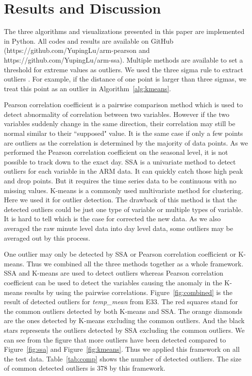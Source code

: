 \section{Results and Discussion}
The three algorithms and visualizations presented in this paper are 
implemented in Python. All codes and results are available on GitHub 
(https://github.com/YupingLu/arm-pearson and https://github.com/YupingLu/arm-ssa). 
Multiple methods are available to set a threshold for extreme values as 
outliers. We used the three sigma rule to extract outliers \cite{pukelsheim1994three}. 
For example, if the distance of one point is larger than three sigmas, 
we treat this point as an outlier in Algorithm~\ref{alg:kmeans}.

Pearson correlation coefficient is a pairwise comparison method which 
is used to detect abnormality of correlation between two variables. 
However if the two variables suddenly change in the same direction, 
their correlation may still be normal similar to their ``supposed" 
value. It is the same case if only a few points are outliers as the
correlation is determined by the majority of data points. 
As we performed the Pearson correlation 
coefficient on the seasonal level, it is not possible to track down 
to the exact day. SSA is a univariate method to detect outliers for 
each variable in the ARM data. It can quickly catch those high peak 
and drop points. But it requires the time series data to be continuous 
with no missing values. K-means is a commonly used multivariate method 
for clustering. Here we used it for outlier detection. The drawback of this method is 
that the detected outliers could be just one type of variable or 
multiple types of variable. It is hard to tell which is the case for 
corrected the new data. As we also averaged the raw 
minute level data into day level data, some outliers may be averaged 
out by this process.

One outlier may only be detected by SSA or Pearson correlation coefficient 
or K-means. Thus we combined all the three methods together as a 
whole framework. SSA and K-means are used to detect outliers whereas Pearson 
correlation coefficient can be used to detect the variables causing the anomaly 
in the K-means results by using the pairwise correlations. Figure~\ref{fig:combined} is the result of 
detected outliers for \textit{temp\_mean} from E33. The red squares 
stand for the common outliers detected by both K-means and SSA. The 
orange diamonds are the ones detected by K-means excluding the common 
outliers. And the black stars represents the outliers detected by SSA 
excluding the common outliers. We can see from the figure that more 
outliers have been detected compared to Figure~\ref{fig:ssa} and Figure~\ref{fig:kmeans}. 
Thus we applied this framework on all the test data. Table~\ref{tab:comp} 
shows the number of detected outliers. The size of common detected 
outliers is 378 by this framework.

